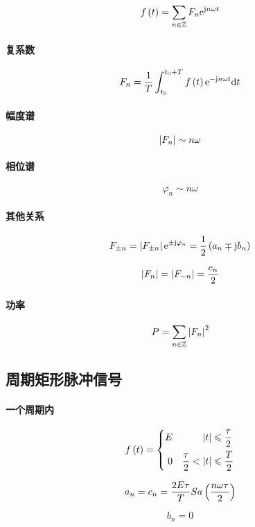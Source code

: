 \documentclass{article}
\begin{document}
\[f\left(t\right)=\sum_{n\in\mathbb Z} F_n\mathrm e^{\mathrm j n\omega t}\]

\paragraph{复系数}

\[F_n=\frac1T\int_{t_0}^{t_0+T}f\left(t\right)\mathrm e^{-\mathrm j n\omega t}\mathrm d t\]

\paragraph{幅度谱}

\[\left|F_n\right|\sim n\omega\]

\paragraph{相位谱}

\[\varphi_n\sim n\omega\]

\paragraph{其他关系}

\[F_{\pm n}=\left|F_{\pm n}\right|\mathrm e^{\pm\mathrm j\varphi_n}=\frac12\left(a_n\mp\mathrm j b_n\right)\]

\[\left|F_n\right|=\left|F_{-n}\right|=\frac{c_n}2\]

\paragraph{功率}

\[P=\sum_{n\in\mathbb Z}\left|F_n\right|^2\]

\subsection{周期矩形脉冲信号}

\paragraph{一个周期内}

\[f\left(t\right)=
    \left\{\begin{aligned}
        E &  & \left|t\right|            & \leqslant\frac\tau2 \\
        0 &  & \frac\tau2<\left|t\right| & \leqslant\frac T2
    \end{aligned}\right.\]

\[a_n=c_n=\frac{2E\tau}TSa\left(\frac{n\omega\tau}2\right)\]

\[b_n=0\]
\end{document}
